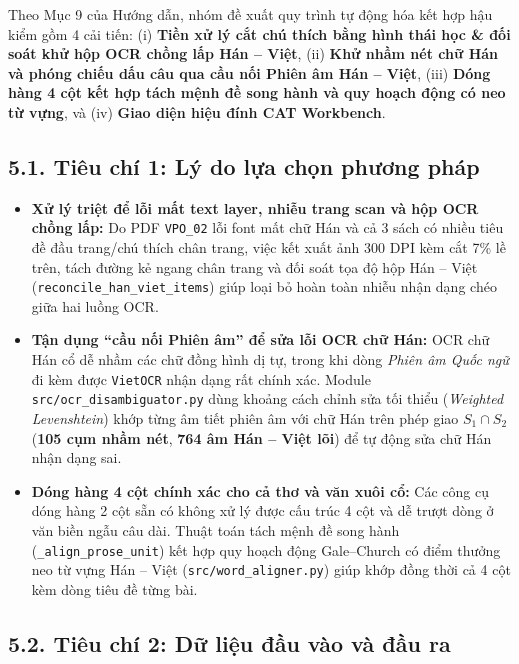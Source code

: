 \documentclass[11pt,a4paper]{article}
\begin{document}
Theo Mục 9 của Hướng dẫn, nhóm đề xuất quy trình tự động hóa kết hợp hậu kiểm gồm 4 cải tiến: (i) \textbf{Tiền xử lý cắt chú thích bằng hình thái học \& đối soát khử hộp OCR chồng lấp Hán -- Việt}, (ii) \textbf{Khử nhầm nét chữ Hán và phóng chiếu dấu câu qua cầu nối Phiên âm Hán -- Việt}, (iii) \textbf{Dóng hàng 4 cột kết hợp tách mệnh đề song hành và quy hoạch động có neo từ vựng}, và (iv) \textbf{Giao diện hiệu đính CAT Workbench}.

\subsection{5.1. Tiêu chí 1: Lý do lựa chọn phương pháp}

\begin{itemize}
    \item \textbf{Xử lý triệt để lỗi mất text layer, nhiễu trang scan và hộp OCR chồng lấp:} Do PDF \texttt{VPO\_02} lỗi font mất chữ Hán và cả 3 sách có nhiều tiêu đề đầu trang/chú thích chân trang, việc kết xuất ảnh 300 DPI kèm cắt 7\% lề trên, tách đường kẻ ngang chân trang và đối soát tọa độ hộp Hán -- Việt (\texttt{reconcile\_han\_viet\_items}) giúp loại bỏ hoàn toàn nhiễu nhận dạng chéo giữa hai luồng OCR.
    \item \textbf{Tận dụng ``cầu nối Phiên âm'' để sửa lỗi OCR chữ Hán:} OCR chữ Hán cổ dễ nhầm các chữ đồng hình dị tự, trong khi dòng \textit{Phiên âm Quốc ngữ} đi kèm được \texttt{VietOCR} nhận dạng rất chính xác. Module \texttt{src/ocr\_disambiguator.py} dùng khoảng cách chỉnh sửa tối thiểu (\textit{Weighted Levenshtein}) khớp từng âm tiết phiên âm với chữ Hán trên phép giao $S_1 \cap S_2$ (\textbf{105 cụm nhầm nét}, \textbf{764 âm Hán -- Việt lõi}) để tự động sửa chữ Hán nhận dạng sai.
    \item \textbf{Dóng hàng 4 cột chính xác cho cả thơ và văn xuôi cổ:} Các công cụ dóng hàng 2 cột sẵn có không xử lý được cấu trúc 4 cột và dễ trượt dòng ở văn biền ngẫu câu dài. Thuật toán tách mệnh đề song hành (\texttt{\_align\_prose\_unit}) kết hợp quy hoạch động Gale--Church có điểm thưởng neo từ vựng Hán -- Việt (\texttt{src/word\_aligner.py}) giúp khớp đồng thời cả 4 cột kèm dòng tiêu đề từng bài.
\end{itemize}

\subsection{5.2. Tiêu chí 2: Dữ liệu đầu vào và đầu ra}
\end{document}
